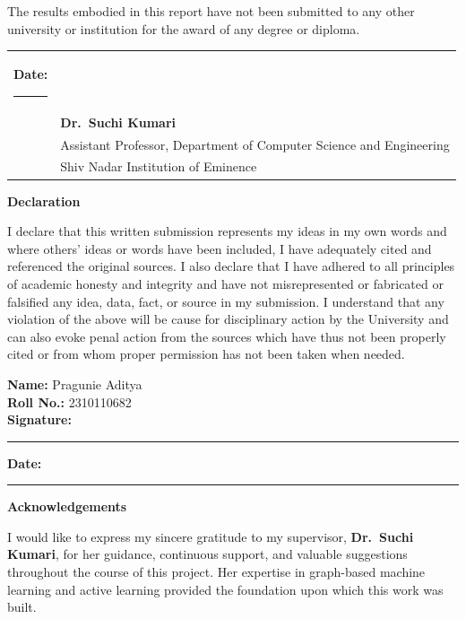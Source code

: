 \documentclass[12pt,a4paper,oneside]{report}
\newcommand{\studentname}{Pragunie Aditya}
\newcommand{\rollno}{2310110682}
\newcommand{\supervisor}{Dr.\ Suchi Kumari}
\newcommand{\supervisortitle}{Assistant Professor, Department of Computer Science and Engineering}
\newcommand{\university}{Shiv Nadar Institution of Eminence}
\begin{document}
The results embodied in this report have not been submitted to any other university or institution for the award of any degree or diploma.

\vspace{3cm}
\noindent
\begin{tabular}{p{7cm}p{7cm}}
\textbf{Date:} \rule{3cm}{0.4pt} & \\[2cm]
& \textbf{\supervisor} \\
& \supervisortitle \\
& \university
\end{tabular}

\newpage
\thispagestyle{empty}
\begin{center}
{\Large\bfseries Declaration}
\end{center}
\vspace{1cm}

I declare that this written submission represents my ideas in my own words and where others' ideas or words have been included, I have adequately cited and referenced the original sources. I also declare that I have adhered to all principles of academic honesty and integrity and have not misrepresented or fabricated or falsified any idea, data, fact, or source in my submission. I understand that any violation of the above will be cause for disciplinary action by the University and can also evoke penal action from the sources which have thus not been properly cited or from whom proper permission has not been taken when needed.

\vspace{2cm}
\noindent
\textbf{Name:} \studentname \\[0.5cm]
\textbf{Roll No.:} \rollno \\[1.5cm]
\textbf{Signature:} \rule{5cm}{0.4pt} \hfill \textbf{Date:} \rule{3cm}{0.4pt}

\newpage
\thispagestyle{empty}
\begin{center}
{\Large\bfseries Acknowledgements}
\end{center}
\vspace{1cm}

I would like to express my sincere gratitude to my supervisor, \textbf{\supervisor}, for her guidance, continuous support, and valuable suggestions throughout the course of this project. Her expertise in graph-based machine learning and active learning provided the foundation upon which this work was built.
\end{document}
